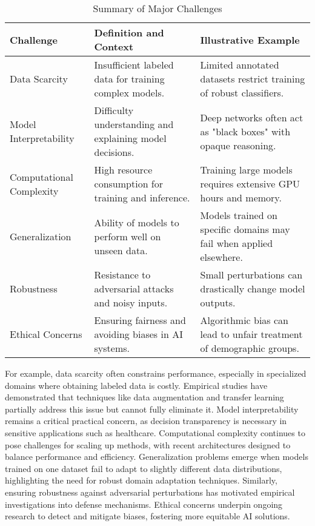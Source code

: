 \documentclass[sigconf]{acmart}
\begin{document}
\begin{table*}[htbp]
\centering
\caption{Summary of Major Challenges}
\label{tab:challenges}
\begin{adjustbox}{max width=\textwidth}
\begin{tabular}{@{}lll@{}}
\toprule
Challenge & Definition and Context & Illustrative Example \\ \midrule
Data Scarcity & Insufficient labeled data for training complex models. & Limited annotated datasets restrict training of robust classifiers. \\
Model Interpretability & Difficulty understanding and explaining model decisions. & Deep networks often act as "black boxes" with opaque reasoning. \\
Computational Complexity & High resource consumption for training and inference. & Training large models requires extensive GPU hours and memory. \\
Generalization & Ability of models to perform well on unseen data. & Models trained on specific domains may fail when applied elsewhere. \\
Robustness & Resistance to adversarial attacks and noisy inputs. & Small perturbations can drastically change model outputs. \\
Ethical Concerns & Ensuring fairness and avoiding biases in AI systems. & Algorithmic bias can lead to unfair treatment of demographic groups. \\ \bottomrule
\end{tabular}
\end{adjustbox}
\end{table*}

For example, data scarcity often constrains performance, especially in specialized domains where obtaining labeled data is costly. Empirical studies have demonstrated that techniques like data augmentation and transfer learning partially address this issue but cannot fully eliminate it. Model interpretability remains a critical practical concern, as decision transparency is necessary in sensitive applications such as healthcare. Computational complexity continues to pose challenges for scaling up methods, with recent architectures designed to balance performance and efficiency. Generalization problems emerge when models trained on one dataset fail to adapt to slightly different data distributions, highlighting the need for robust domain adaptation techniques. Similarly, ensuring robustness against adversarial perturbations has motivated empirical investigations into defense mechanisms. Ethical concerns underpin ongoing research to detect and mitigate biases, fostering more equitable AI solutions.
\end{document}
